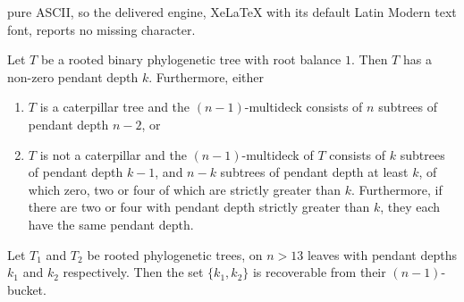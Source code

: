 \documentclass[10pt,a4paper]{amsart}
\begin{document}
pure ASCII, so the delivered engine, XeLaTeX with its default Latin Modern text font, reports no missing character.
\begin{Lemma}\label{pendant_depth_lemma}
    Let $T$ be a rooted binary phylogenetic tree with root balance $1$. Then $T$ has a non-zero pendant depth $k$. Furthermore, either 
    
    \begin{enumerate}
        \item $T$ is a caterpillar tree and the $(n-1)$-multideck consists of $n$ subtrees of pendant depth $n-2$, or
        \item $T$ is not a caterpillar and the $(n-1)$-multideck of $T$ consists of $k$ subtrees of pendant depth $k-1$, and $n-k$ subtrees of pendant depth at least $k$, of which zero, two or four of which are strictly greater than $k$. Furthermore, if there are two or four with pendant depth strictly greater than $k$, they each have the same pendant depth.
    \end{enumerate} 
\end{Lemma}

\begin{Theorem}\label{t:pendant.depth.recoverable}
    Let $T_1$ and $T_2$ be rooted phylogenetic trees, on $n>13$ leaves with pendant depths $k_1$ and $k_2$ respectively. Then the set $\{k_1, k_2\}$ is recoverable from their $(n-1)$-bucket.
\end{Theorem}
\end{document}
